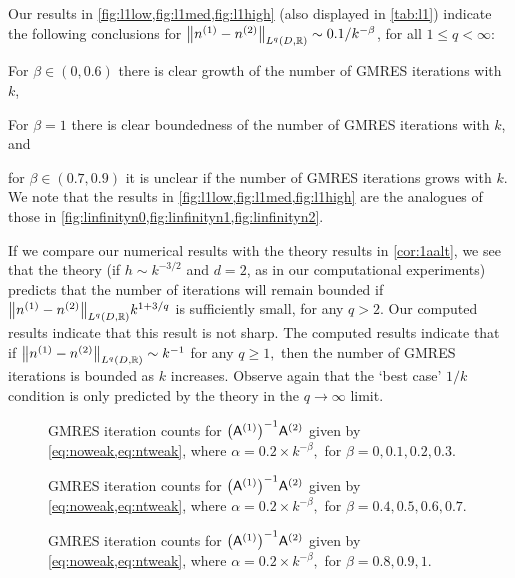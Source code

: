 Our results in \cref{fig:l1low,fig:l1med,fig:l1high} (also displayed in \cref{tab:l1}) indicate the following conclusions for $\NLqDRR{\nso-\nst} \sim 0.1/k^{-\beta}$, for all $1 \leq q < \infty$:
\bit
\item For $\beta \in (0,0.6)$ there is clear growth of the number of GMRES iterations with $k$,
\item For $\beta = 1$ there is clear boundedness of the number of GMRES iterations with $k$, and
  \item for $\beta \in (0.7,0.9)$ it is unclear if the number of GMRES iterations grows with $k.$
    \eit
We note that the results in \cref{fig:l1low,fig:l1med,fig:l1high} are the analogues of those in \cref{fig:linfinityn0,fig:linfinityn1,fig:linfinityn2}.

If we compare our numerical results with the theory results in \cref{cor:1aalt}, we see that the theory (if $h \sim k^{-3/2}$ and $d=2$, as in our computational experiments) predicts that the number of iterations will remain bounded if $\NLqDRR{\nso-\nst} k^{1+3/q}$ is sufficiently small, for any $q > 2.$ Our computed results indicate that this result is not sharp. The computed results indicate that if $\NLqDRR{\nso-\nst} \sim k^{-1}$ for any $q \geq 1,$ then the number of GMRES iterations is bounded as $k$ increases. Observe again that the `best case' $1/k$ condition is only predicted by the theory in the $q\rightarrow \infty$ limit.

\begin{figure}

  \caption[GMRES iteration counts when $\NLqDRR{\nso-\nst} = 0.2\times k^{-\beta},$ for any $1 \leq q < \infty$ and $\beta = 0,0.1,0.2,0.3$.]{GMRES iteration counts for $\AmatoI\Amatt$ given by \cref{eq:noweak,eq:ntweak}, where $\alpha = 0.2\times k^{-\beta},$ for $\beta = 0,0.1,0.2,0.3.$}\label{fig:l1low}
\end{figure}

\begin{figure}
  
    \caption[GMRES iteration counts when $\NLqDRR{\nso-\nst} = 0.2\times k^{-\beta},$ for any $1 \leq q < \infty$ and $\beta = 0.4,0.5,0.6,0.7$.]{GMRES iteration counts for $\AmatoI\Amatt$ given by \cref{eq:noweak,eq:ntweak}, where $\alpha = 0.2\times k^{-\beta},$ for $\beta = 0.4,0.5,0.6,0.7.$}\label{fig:l1med}
\end{figure}
    
    \begin{figure}
    
      \caption[GMRES iteration counts when $\NLqDRR{\nso-\nst} = 0.2\times k^{-\beta},$ for any $1 \leq q < \infty$ and $\beta = 0.8,0.9,1$.]{GMRES iteration counts for $\AmatoI\Amatt$ given by \cref{eq:noweak,eq:ntweak}, where $\alpha = 0.2\times k^{-\beta},$ for $\beta = 0.8,0.9,1.$}\label{fig:l1high}
\end{figure}

